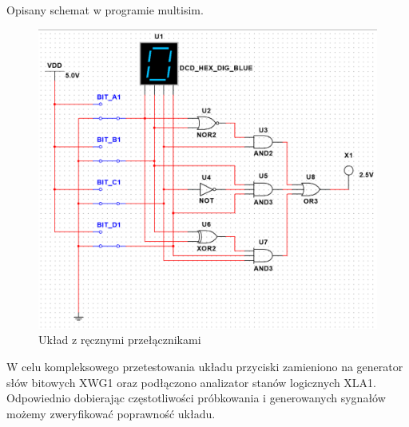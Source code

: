 \documentclass[12pt,a4paper,openright]{mwrep}
\begin{document}
Opisany schemat w programie multisim.
\begin{figure}[H]
    \centering
    \includegraphics[width=1\textwidth]{images/1b_schema_1.PNG}
    \caption{Układ z ręcznymi przełącznikami}
    \label{rys:1b_usable_circuit}
\end{figure}

W celu kompleksowego przetestowania układu przyciski zamieniono na generator słów bitowych XWG1 
oraz podłączono analizator stanów logicznych XLA1.
Odpowiednio dobierając częstotliwości próbkowania i generowanych sygnałów możemy zweryfikować poprawność układu.
\end{document}
